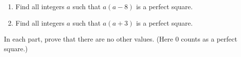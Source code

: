 \begin{enumerate}
\item[(a)] Find all integers $a$ such that $a(a-8)$ is a perfect square.
\item[(b)] Find all integers $a$ such that $a(a+3)$ is a perfect square.
\end{enumerate}
In each part, prove that there are no other values. (Here $0$ counts as a perfect square.)

